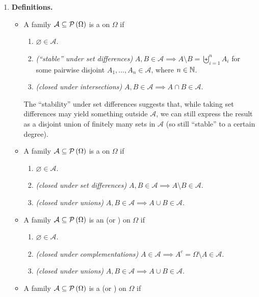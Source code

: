 \begin{enumerate}
\item \textbf{Definitions.}
\begin{itemize}
\item A family \(\mathcal{A}\subseteq \mathcal{P}\left(\Omega\right)\) is a  on
\(\Omega\) if
\begin{enumerate}[label={(\arabic*)}]
\item \(\varnothing\in\mathcal{A}\).
\item \emph{(``stable'' under set differences)}
\(A,B\in\mathcal{A}\implies A\setminus B=\biguplus_{i=1}^{n}A_i\) for
some pairwise disjoint \(A_1,\dotsc,A_n\in\mathcal{A}\), where \(n\in\mathbb{N}\).
\item \emph{(closed under intersections)} \(A,B\in\mathcal{A}\implies A\cap B\in\mathcal{A}\).
\end{enumerate}
\begin{note}
The ``stability'' under set differences suggests that, while taking set
differences may yield something outside \(\mathcal{A}\), we can still express
the result as a disjoint union of finitely many sets in \(\mathcal{A}\) (so
still ``stable'' to a certain degree).
\end{note}
\item A family \(\mathcal{A}\subseteq \mathcal{P}\left(\Omega\right)\) is a  on \(\Omega\) if
\begin{enumerate}[label={(\arabic*)}]
\item \(\varnothing\in\mathcal{A}\).
\item \emph{(closed under set differences)}
\(A,B\in\mathcal{A}\implies A\setminus B\in\mathcal{A}\).
\item \emph{(closed under unions)} \(A,B\in\mathcal{A}\implies A\cup B\in\mathcal{A}\).
\end{enumerate}
\item A family \(\mathcal{A}\subseteq \mathcal{P}\left(\Omega\right)\) is an  (or
) on \(\Omega\) if
\begin{enumerate}[label={(\arabic*)}]
\item \(\varnothing\in\mathcal{A}\).
\item \emph{(closed under complementations)} \(A\in\mathcal{A}\implies A^c=\Omega\setminus A\in\mathcal{A}\).
\item \emph{(closed under unions)}
\(A,B\in\mathcal{A}\implies A\cup B\in\mathcal{A}\).
\end{enumerate}
\item \ystar{} A family \(\mathcal{A}\subseteq \mathcal{P}\left(\Omega\right)\) is a
 (or ) on \(\Omega\) if

\end{itemize}
\end{enumerate}

